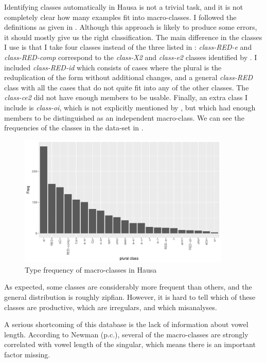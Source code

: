 Identifying  classes automatically in Hausa is not a trivial task, and it is not completely clear how many examples fit into  macro-classes. I followed the definitions as given in . Although this approach is likely to produce some errors, it should mostly give us the right classification. The main difference in the classes I use is that I take four  classes instead of the three listed in : \textit{class-RED-e} and \textit{class-RED-comp} correspond to the \textit{class-X2} and \textit{class-e2} classes identified by \textcite{Newman.2000}. I included \textit{class-RED-id} which consists of cases where the plural is the reduplication of the  form without additional changes, and a general \textit{class-RED} class with all the cases that do not quite fit into any of the other classes. The \textit{class-ce2} did not have enough members to be usable. Finally, an extra class I include is \textit{class-oi}, which is not explicitly mentioned by \textcite{Newman.2000}, but which had enough members to be distinguished as an independent macro-class. We can see the frequencies of the classes in the data-set in .

\begin{figure}
  \includegraphics[width=0.9\textwidth]{./figures/hausa/class-freqs.pdf}
  \caption{Type frequency of macro-classes in Hausa}\label{fig:class-hausa-freqs}
\end{figure}

As expected, some classes are considerably more frequent than others, and the general distribution is roughly zipfian. However, it is hard to tell which of these classes are productive, which are irregulars, and which misanalyses.

A serious shortcoming of this database is the lack of information about vowel length. According to Newman (p.c.), several of the macro-classes are strongly correlated with vowel length of the singular, which means there is an important factor missing.

